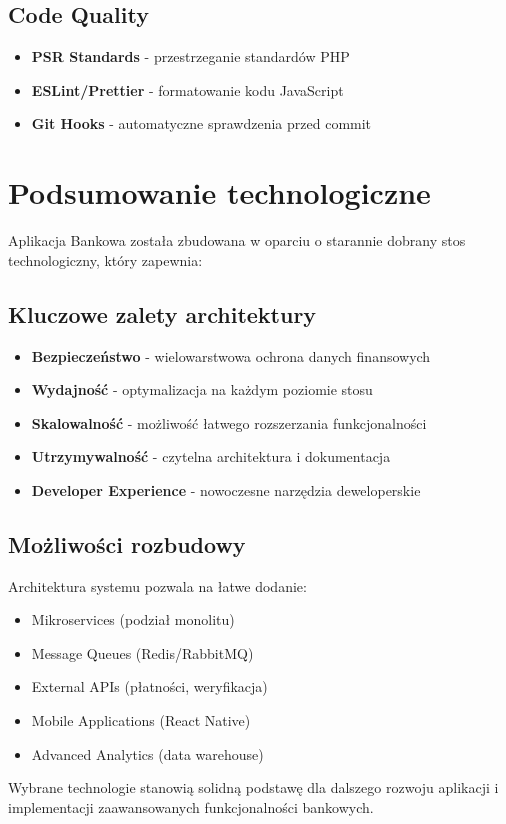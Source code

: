     \subsection{Code Quality}

    \begin{itemize}
        \item \textbf{PSR Standards} - przestrzeganie standardów PHP
        \item \textbf{ESLint/Prettier} - formatowanie kodu JavaScript
        \item \textbf{Git Hooks} - automatyczne sprawdzenia przed commit
    \end{itemize}

    \section{Podsumowanie technologiczne}

    Aplikacja Bankowa została zbudowana w oparciu o starannie dobrany stos technologiczny, który zapewnia:

    \subsection{Kluczowe zalety architektury}

    \begin{itemize}
        \item \textbf{Bezpieczeństwo} - wielowarstwowa ochrona danych finansowych
        \item \textbf{Wydajność} - optymalizacja na każdym poziomie stosu
        \item \textbf{Skalowalność} - możliwość łatwego rozszerzania funkcjonalności
        \item \textbf{Utrzymywalność} - czytelna architektura i dokumentacja
        \item \textbf{Developer Experience} - nowoczesne narzędzia deweloperskie
    \end{itemize}

    \subsection{Możliwości rozbudowy}

    Architektura systemu pozwala na łatwe dodanie:
    \begin{itemize}
        \item Mikroservices (podział monolitu)
        \item Message Queues (Redis/RabbitMQ)
        \item External APIs (płatności, weryfikacja)
        \item Mobile Applications (React Native)
        \item Advanced Analytics (data warehouse)
    \end{itemize}

    Wybrane technologie stanowią solidną podstawę dla dalszego rozwoju aplikacji i implementacji zaawansowanych funkcjonalności bankowych.


